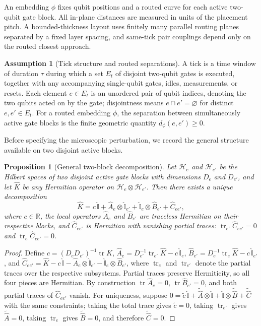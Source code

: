 \documentclass[
aps,
prx,
10pt,
twocolumn,
groupedaddress,
longbibliography,
nofootinbib,
floatfix
]{revtex4-2}
\newtheorem{proposition}{Proposition}
\theoremstyle{definition}
\newtheorem{assumption}{Assumption}
\newcommand{\I}{\hat{\mathbb{I}}}
\begin{document}
An embedding $\phi$ fixes qubit positions and a routed curve for each active two-qubit gate block. All in-plane distances are measured in units of the placement pitch. A bounded-thickness layout uses finitely many parallel routing planes separated by a fixed layer spacing, and same-tick pair couplings depend only on the routed closest approach.

\begin{assumption}[Tick structure and routed separations]
A tick is a time window of duration $\tau$ during which a set $E_t$ of disjoint two-qubit gates is executed, together with any accompanying single-qubit gates, idles, measurements, or resets. Each element $e\in E_t$ is an unordered pair of qubit indices, denoting the two qubits acted on by the gate; disjointness means $e\cap e'=\varnothing$ for distinct $e,e'\in E_t$. For a routed embedding $\phi$, the separation between simultaneously active gate blocks is the finite geometric quantity $d_{\phi}(e,e')\ge 0$.
\end{assumption}

Before specifying the microscopic perturbation, we record the general structure available on two disjoint active blocks.

\begin{proposition}[General two-block decomposition]
\label{prop:two-block-decomp}
Let $\mathcal{H}_e$ and $\mathcal{H}_{e'}$ be the Hilbert spaces of two disjoint active gate blocks with dimensions $D_e$ and $D_{e'}$, and let $\hat K$ be any Hermitian operator on $\mathcal{H}_e\otimes\mathcal{H}_{e'}$. Then there exists a unique decomposition
\begin{equation}
\hat K = c\,\I + \hat A_e\otimes\I_{e'} + \I_e\otimes\hat B_{e'} + \hat C_{ee'},
\label{eq:two-block-decomp}
\end{equation}
where $c\in\mathbb{R}$, the local operators $\hat A_e$ and $\hat B_{e'}$ are traceless Hermitian on their respective blocks, and $\hat C_{ee'}$ is Hermitian with vanishing partial traces: $\operatorname{tr}_{e'}\hat C_{ee'}=0$ and $\operatorname{tr}_e\hat C_{ee'}=0$.
\end{proposition}

\begin{proof}
Define $c=(D_e D_{e'})^{-1}\operatorname{tr}\hat K$, \; $\hat A_e=D_{e'}^{-1}\operatorname{tr}_{e'}\hat K - c\,\I_e$, \; $\hat B_{e'}=D_e^{-1}\operatorname{tr}_e\hat K - c\,\I_{e'}$, and $\hat C_{ee'}=\hat K - c\,\I - \hat A_e\otimes\I_{e'} - \I_e\otimes\hat B_{e'}$, where $\operatorname{tr}_e$ and $\operatorname{tr}_{e'}$ denote the partial traces over the respective subsystems. Partial traces preserve Hermiticity, so all four pieces are Hermitian. By construction $\operatorname{tr}\hat A_e=0$, $\operatorname{tr}\hat B_{e'}=0$, and both partial traces of $\hat C_{ee'}$ vanish. For uniqueness, suppose $0=\tilde c\,\I+\tilde{\hat A}\otimes\I+\I\otimes\tilde{\hat B}+\tilde{\hat C}$ with the same constraints; taking the total trace gives $\tilde c=0$, taking $\operatorname{tr}_{e'}$ gives $\tilde{\hat A}=0$, taking $\operatorname{tr}_e$ gives $\tilde{\hat B}=0$, and therefore $\tilde{\hat C}=0$.
\end{proof}
\end{document}
